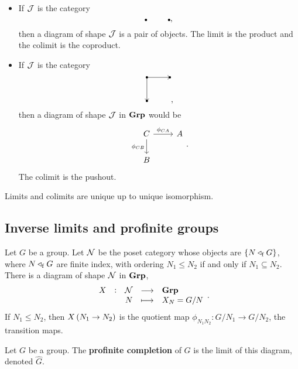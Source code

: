 \begin{example*}
\hfill
\begin{itemize}
\item If $ \mathcal{J} $ is the category
$$
\begin{tikzpicture}
\fill (0, 0) circle (0.05);
\fill (1, 0) circle (0.05);
\end{tikzpicture},
$$
then a diagram of shape $ \mathcal{J} $ is a pair of objects. The limit is the product and the colimit is the coproduct.
\item If $ \mathcal{J} $ is the category
$$
\begin{tikzpicture}
\fill (0, 0) circle (0.05);
\fill (1, 0) circle (0.05);
\fill (0, -1) circle (0.05);
\draw [->] (0, 0) to (1, 0);
\draw [->] (0, 0) to (0, -1);
\end{tikzpicture},
$$
then a diagram of shape $ \mathcal{J} $ in $ \textbf{Grp} $ would be
$$
\begin{tikzcd}
C \arrow{r}{\phi_{CA}} \arrow{d}[swap]{\phi_{CB}} & A \\
B &
\end{tikzcd}.
$$
The colimit is the pushout.
\end{itemize}
\end{example*}

\begin{proposition}
Limits and colimits are unique up to unique isomorphism.
\end{proposition}

\pagebreak

\subsection{Inverse limits and profinite groups}

Let $ G $ be a group. Let $ \mathcal{N} $ be the poset category whose objects are $ \cbr{N \triangleleft_\f G} $, where $ N \triangleleft_{\mathrm{f}} G $ are finite index, with ordering $ N_1 \le N_2 $ if and only if $ N_1 \subseteq N_2 $. There is a diagram of shape $ \mathcal{N} $ in $ \textbf{Grp} $,
$$ \function[X]{\NNN}{\Grp}{N}{X_N = G / N}. $$
If $ N_1 \le N_2 $, then $ X\br{N_1 \to N_2} $ is the quotient map $ \phi_{N_1N_2} : G / N_1 \to G / N_2 $, the transition maps.

\begin{definition*}
Let $ G $ be a group. The \textbf{profinite completion} of $ G $ is the limit of this diagram, denoted $ \widehat{G} $.
\end{definition*}

